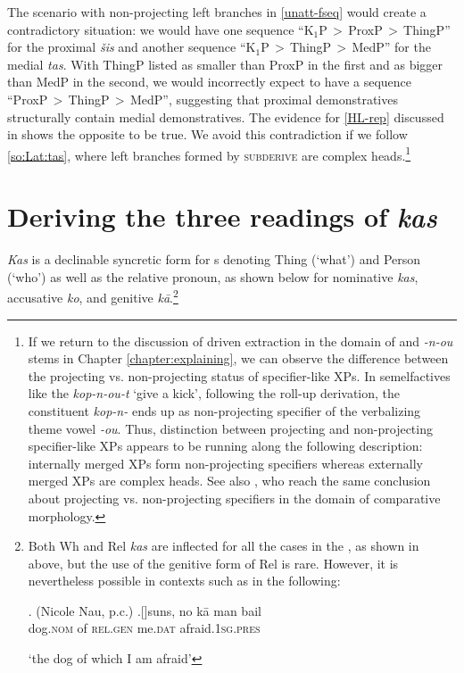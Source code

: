  
\noindent The scenario with non-projecting left branches in \ref{unatt-fseq} would create a contradictory situation: we would have one sequence ``K$_{1}$P\,$>$\,ProxP\,$>$\,ThingP'' for the proximal \textit{\v{s}is} and another sequence ``K$_{1}$P\,$>$\,ThingP\,$>$\,MedP'' for the medial \textit{tas}. With ThingP listed as smaller than ProxP in the first and as bigger than MedP in the second, we would incorrectly expect to have a sequence ``ProxP\,$>$\,ThingP\,$>$\,MedP'', suggesting that proximal demonstratives structurally contain medial demonstratives. The evidence for \ref{HL-rep} discussed in \cite{Lander-Haegeman2016} shows the opposite to be true.
We avoid this contradiction if we follow \ref{so:Lat:tas}, where left branches formed by \textsc{subderive} are complex heads.\footnote{If we return to the discussion of  driven extraction in the domain of  and   \textit{-n-ou} stems in Chapter \ref{chapter:explaining}, we can observe the difference between the projecting vs. non-projecting status of specifier-like XPs. In semelfactives like the  \textit{kop-n-ou-t} `give a kick', following the roll-up derivation, the constituent \textit{kop-n-} ends up as non-projecting specifier of the verbalizing theme  vowel \textit{-ou}. Thus, distinction between projecting and non-projecting  specifier-like XPs appears to be running along the following description: internally merged XPs form non-projecting specifiers whereas externally merged XPs are complex heads. See also \cite{CCW2017}, who reach the same conclusion about projecting vs. non-projecting specifiers in the domain of  comparative morphology.
} %

\section{Deriving the three readings of \textit{kas}}\label{section:kas}

\textit{Kas} is a declinable syncretic form for s denoting Thing (`what') and Person (`who') as well as the relative pronoun,  as shown below for nominative \textit{kas}, accusative \textit{ko}, and genitive 
\textit{k\={a}}.\footnote{Both Wh and Rel \textit{kas} are inflected for all the cases in the  , as shown in  above, but the use of the genitive form of Rel is rare. However, it is nevertheless possible in contexts such as in the following:

\noindent\parbox{\linguexfootnotewidth}{\ex.  (Nicole Nau, p.c.)
\ag.[]\hspace{-22pt}suns, no k\={a} man bail\\
\hspace{-22pt}dog.\textsc{nom} of \textsc{rel.gen} me.\textsc{dat} afraid.\textsc{1sg.pres}\\
\hspace{-22pt}\strut `the dog of which I am afraid'

}}%

